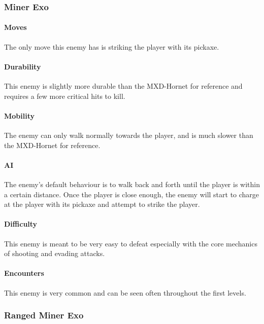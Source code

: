 \documentclass[12pt]{article}
\begin{document}
\subsubsection{Miner Exo}

\paragraph{Moves}

The only move this enemy has is striking the player with its pickaxe.

\paragraph{Durability}

This enemy is slightly more durable than the MXD-Hornet for reference and requires a few more critical hits to kill. 

\paragraph{Mobility}

The enemy can only walk normally towards the player, and is much slower than the MXD-Hornet for reference.

\paragraph{AI}

The enemy's default behaviour is to walk back and forth until the player is within a certain distance. Once the player is close enough, the enemy will start to charge at the player with its pickaxe and attempt to strike the player.

\paragraph{Difficulty}

This enemy is meant to be very easy to defeat especially with the core mechanics of shooting and evading attacks. 

\paragraph{Encounters}

This enemy is very common and can be seen often throughout the first levels.

\subsubsection{Ranged Miner Exo}
\end{document}
